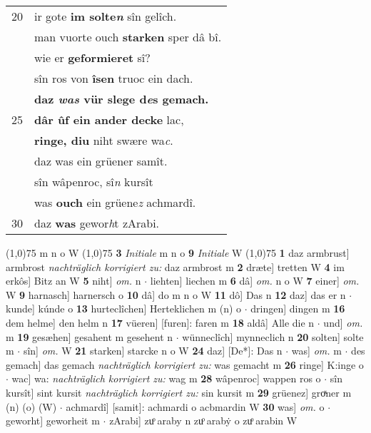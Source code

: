 \documentclass[8pt,a4paper,notitlepage]{article}
\begin{document}
\begin{table}[ht]
\begin{minipage}[t]{0.5\linewidth}
\begin{tabular}{rl}
20 & ir gote \textbf{im solte\textit{n}} sîn gelîch.\\ 
 & man vuorte ouch \textbf{starken} sper dâ bî.\\ 
 & wie er \textbf{geformieret} sî?\\ 
 & sîn ros von \textbf{îsen} truoc ein dach.\\ 
 & \textbf{daz \textit{was} vür slege d\textit{e}s gemach.}\\ 
25 & \textbf{dâr ûf ein ander decke} lac,\\ 
 & \textbf{ringe, diu} niht swære wa\textit{c}.\\ 
 & daz was ein grüener samît.\\ 
 & sîn wâpenroc, sî\textit{n} kursît\\ 
 & was \textbf{ouch} ein grüene\textit{z} achmardî.\\ 
30 & daz \textbf{was} gewor\textit{h}t zArabi.\\ 
\end{tabular}
\scriptsize
\line(1,0){75} \newline
m n o W \newline
\line(1,0){75} \newline
\textbf{3} \textit{Initiale} m n o  \textbf{9} \textit{Initiale} W  \newline
\line(1,0){75} \newline
\textbf{1} daz armbrust] armbrost \textit{nachträglich korrigiert zu:} daz armbrost m \textbf{2} dræte] tretten W \textbf{4} im erkôs] Bitz an W \textbf{5} niht] \textit{om.} n  $\cdot$ liehten] liechen m \textbf{6} dâ] \textit{om.} n o W \textbf{7} einer] \textit{om.} W \textbf{9} harnasch] harnersch o \textbf{10} dâ] do m n o W \textbf{11} dô] Das n \textbf{12} daz] das er n  $\cdot$ kunde] kúnde o \textbf{13} hurteclîchen] Herteklichen m (n) o  $\cdot$ dringen] dingen m \textbf{16} dem helme] den helm n \textbf{17} vüeren] [furen]: faren m \textbf{18} aldâ] Alle die n  $\cdot$ und] \textit{om.} m \textbf{19} gesæhen] gesahent m gesehent n  $\cdot$ wünneclîch] mynneclich n \textbf{20} solten] solte m  $\cdot$ sîn] \textit{om.} W \textbf{21} starken] starcke n o W \textbf{24} daz] [De*]: Das n  $\cdot$ was] \textit{om.} m  $\cdot$ des gemach] das gemach \textit{nachträglich korrigiert zu:} was gemacht m \textbf{26} ringe] K:inge o  $\cdot$ wac] wa: \textit{nachträglich korrigiert zu:} wag m \textbf{28} wâpenroc] wappen ros o  $\cdot$ sîn kursît] sint kursit \textit{nachträglich korrigiert zu:} sin kursit m \textbf{29} grüenez] groͯner m (n) (o) (W)  $\cdot$ achmardî] [samit]: achmardi o acbmardin W \textbf{30} was] \textit{om.} o  $\cdot$ geworht] geworheit m  $\cdot$ zArabi] zuͦ araby n zuͦ arabẏ o zuͦ arabin W \newline
\end{minipage}
\end{table}
\end{document}
